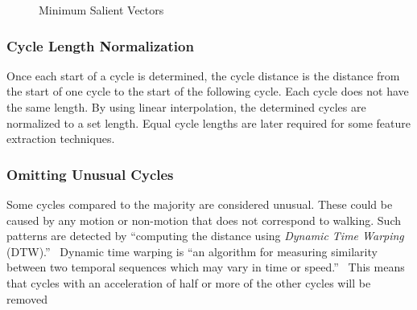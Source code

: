 \documentclass{sig-alternate}
\begin{document}
\begin{figure*}
\centering
{}
\caption{Minimum Salient Vectors}
\label{fig:AccelChart}
\end{figure*}

\subsubsection{Cycle Length Normalization}
Once each start of a cycle is determined, the cycle distance is the distance from the start of one cycle to the start of the following cycle. Each cycle does not have the same length. By using linear interpolation, the determined cycles are normalized to a set length. Equal cycle lengths are later required for some feature extraction techniques. 
\subsubsection{Omitting Unusual Cycles}
Some cycles compared to the majority are considered unusual. These could be caused by any motion or non-motion that does not correspond to walking. Such patterns are detected by ``computing the distance using \textit{Dynamic Time Warping} (DTW).''~\cite{Muaaz:2013} Dynamic time warping is ``an algorithm for measuring similarity between two temporal sequences which may vary in time or speed.''~\cite{wiki2:2014} This means that cycles with an acceleration of half or more of the other cycles will be removed
\end{document}
